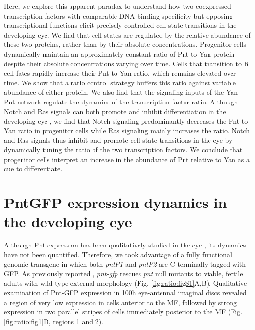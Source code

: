 Here, we explore this apparent paradox to understand how two coexpressed transcription factors with comparable DNA binding specificity but opposing transcriptional functions elicit precisely controlled cell state transitions in the developing eye. We find that cell states are regulated by the relative abundance of these two proteins, rather than by their absolute concentrations. Progenitor cells dynamically maintain an approximately constant ratio of Pnt-to-Yan protein despite their absolute concentrations varying over time. Cells that transition to R cell fates rapidly increase their Pnt-to-Yan ratio, which remains elevated over time. We show that a ratio control strategy buffers this ratio against variable abundance of either protein. We also find that the signaling inputs of the Yan-Pnt network regulate the dynamics of the transcription factor ratio. Although Notch and Ras signals can both promote and inhibit differentiation in the developing eye \cite{Fortini1993,Freeman1996}, we find that Notch signaling predominantly decreases the Pnt-to-Yan ratio in progenitor cells while Ras signaling mainly increases the ratio. Notch and Ras signals thus inhibit and promote cell state transitions in the eye by dynamically tuning the ratio of the two transcription factors. We conclude that progenitor cells interpret an increase in the abundance of Pnt relative to Yan as a cue to differentiate.

\section{PntGFP expression dynamics in the developing eye }

Although Pnt expression has been qualitatively studied in the eye \cite{BoisclairLachance2014}, its dynamics have not been quantified. Therefore, we took advantage of a fully functional genomic transgene in which both \textit{pntP1} and \textit{pntP2} are C-terminally tagged with GFP. As previously reported \cite{BoisclairLachance2014}, \textit{pnt-gfp} rescues \textit{pnt} null mutants to viable, fertile adults with wild type external morphology (Fig. \ref{fig:ratio:figS1}A,B). Qualitative examination of Pnt-GFP expression in 100h eye-antennal imaginal discs revealed a region of very low expression in cells anterior to the MF, followed by strong expression in two parallel stripes of cells immediately posterior to the MF (Fig. \ref{fig:ratio:fig1}D, regions 1 and 2).

